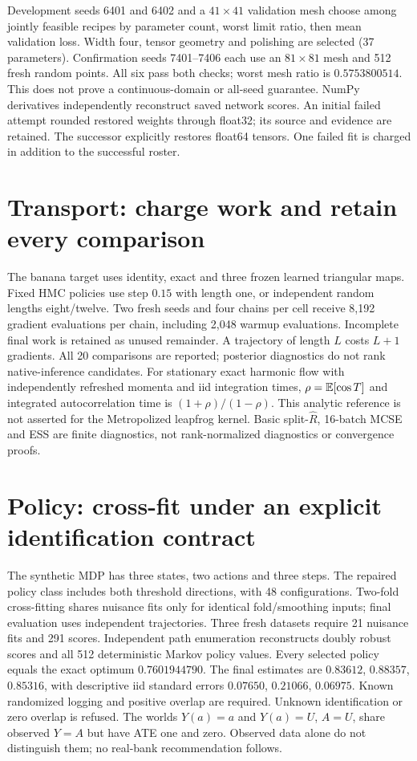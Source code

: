 Development seeds 6401 and 6402 and a $41\times41$ validation mesh choose
among jointly feasible recipes by parameter count, worst limit ratio, then
mean validation loss. Width four, tensor geometry and polishing are selected
(37 parameters). Confirmation seeds 7401--7406 each use an $81\times81$ mesh
and 512 fresh random points. All six pass both checks; worst mesh ratio is
$0.5753800514$. This does not prove a continuous-domain or all-seed guarantee.
NumPy derivatives independently reconstruct saved network scores.
An initial failed attempt rounded restored weights through float32; its source
and evidence are retained. The successor explicitly restores float64 tensors.
One failed fit is charged in addition to the successful roster.

\section{Transport: charge work and retain every comparison}
The banana target uses identity, exact and three frozen learned triangular
maps. Fixed HMC policies use step $0.15$ with length one, or independent
random lengths eight/twelve. Two fresh seeds and four chains per cell receive
8,192 gradient evaluations per chain, including 2,048 warmup evaluations.
Incomplete final work is retained as unused remainder. A trajectory of length
$L$ costs $L+1$ gradients. All 20 comparisons are reported; posterior
diagnostics do not rank native-inference candidates.
For stationary exact harmonic flow with independently refreshed momenta and
iid integration times, $\rho=\mathbb{E}[\cos T]$ and integrated autocorrelation time
is $(1+\rho)/(1-\rho)$. This analytic reference is not asserted for the
Metropolized leapfrog kernel. Basic split-$\widehat R$, 16-batch MCSE and ESS
are finite diagnostics, not rank-normalized diagnostics or convergence proofs.

\section{Policy: cross-fit under an explicit identification contract}
The synthetic MDP has three states, two actions and three steps. The repaired
policy class includes both threshold directions, with 48 configurations.
Two-fold cross-fitting shares nuisance fits only for identical fold/smoothing
inputs; final evaluation uses independent trajectories. Three fresh datasets
require 21 nuisance fits and 291 scores. Independent path enumeration
reconstructs doubly robust scores and all 512 deterministic Markov policy
values. Every selected policy equals the exact optimum $0.7601944790$.
The final estimates are $0.83612$, $0.88357$, $0.85316$, with descriptive iid
standard errors $0.07650$, $0.21066$, $0.06975$.
Known randomized logging and positive overlap are required. Unknown
identification or zero overlap is refused. The worlds $Y(a)=a$ and
$Y(a)=U$, $A=U$, share observed $Y=A$ but have ATE one and zero.
Observed data alone do not distinguish them; no real-bank recommendation follows.

